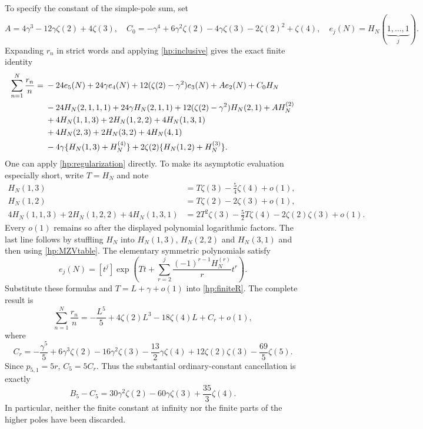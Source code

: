 \documentclass[11pt]{article}
\numberwithin{equation}{section}
\theoremstyle{plain}
\theoremstyle{definition}
\theoremstyle{remark}
\begin{document}
To specify the constant of the simple-pole sum, set
\[
 A=4\gamma^3-12\gamma\zeta(2)+4\zeta(3),\quad
 C_0=-\gamma^4+6\gamma^2\zeta(2)-4\gamma\zeta(3)
                       -2\zeta(2)^2+\zeta(4),
 \quad e_j(N)=H_N(\underbrace{1,\ldots,1}_{j}).
\]
Expanding $r_n$ in strict words and applying
\eqref{hp:inclusive} gives the exact finite identity
\begin{align}\label{hp:finiteR}
 \sum_{n=1}^N\frac{r_n}{n}={}&-24e_5(N)+24\gamma e_4(N)
       +12(\zeta(2)-\gamma^2)e_3(N)+Ae_2(N)+C_0H_N\notag\\
 &-24H_N(2,1,1,1)+24\gamma H_N(2,1,1)
       +12(\zeta(2)-\gamma^2)H_N(2,1)+AH_N^{(2)}\notag\\
 &+4H_N(1,1,3)+2H_N(1,2,2)+4H_N(1,3,1)\notag\\
 &+4H_N(2,3)+2H_N(3,2)+4H_N(4,1)\notag\\
 &-4\gamma\{H_N(1,3)+H_N^{(4)}\}
          +2\zeta(2)\{H_N(1,2)+H_N^{(3)}\}.
\end{align}
One can apply \eqref{hp:regularization} directly. To make its
asymptotic evaluation especially short, write $T=H_N$ and note
\begin{align*}
 H_N(1,3)&=T\zeta(3)-\tfrac54\zeta(4)+o(1),\\
 H_N(1,2)&=T\zeta(2)-2\zeta(3)+o(1),\\
 4H_N(1,1,3)+2H_N(1,2,2)+4H_N(1,3,1)
   &=2T^2\zeta(3)-\tfrac52T\zeta(4)
                                  -2\zeta(2)\zeta(3)+o(1).
\end{align*}
Every $o(1)$ remains so after the displayed polynomial logarithmic
factors. The last line follows by stuffling $H_N$ into
$H_N(1,3)$, $H_N(2,2)$ and $H_N(3,1)$ and then using
\eqref{hp:MZVtable}. The elementary symmetric polynomials satisfy
\[
 e_j(N)=[t^j]\exp\left(Tt+
           \sum_{r=2}^j\frac{(-1)^{r-1}H_N^{(r)}}r t^r\right).
\]
Substitute these formulas and $T=L+\gamma+o(1)$ into
\eqref{hp:finiteR}. The complete result is
\begin{equation}\label{hp:Casym}
 \sum_{n=1}^N\frac{r_n}{n}
   =-\frac{L^5}{5}+4\zeta(2)L^3-18\zeta(4)L+C_r+o(1),
\end{equation}
where
\begin{equation}\label{hp:Cr}
 C_r=-\frac{\gamma^5}{5}+6\gamma^3\zeta(2)
      -16\gamma^2\zeta(3)-\frac{13}{2}\gamma\zeta(4)
      +12\zeta(2)\zeta(3)-\frac{69}{5}\zeta(5).
\end{equation}
Since $p_{5,1}=5r$, $C_5=5C_r$. Thus the substantial ordinary-constant
cancellation is exactly
\begin{equation}\label{hp:BCcancel}
 B_5-C_5=30\gamma^2\zeta(2)-60\gamma\zeta(3)+\frac{35}{3}\zeta(4).
\end{equation}
In particular, neither the finite constant at infinity nor the
finite parts of the higher poles have been discarded.
\end{document}
